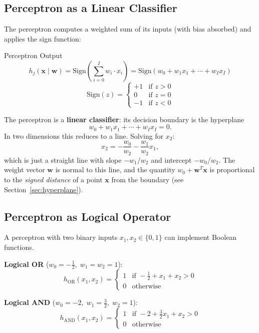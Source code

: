 \documentclass[11pt,a4paper]{article}
\newcommand{\term}[1]{\textcolor{DefGreen}{\textbf{#1}}}
\begin{document}
\subsection{Perceptron as a Linear Classifier}

The perceptron computes a weighted sum of its inputs (with bias absorbed) and applies the sign function:

\begin{defbox}{Perceptron Output}
\[
h_j(\mathbf{x} \mid \mathbf{w}) = \mathrm{Sign}\!\left(\sum_{i=0}^{I} w_i \cdot x_i\right)
= \mathrm{Sign}(w_0 + w_1 x_1 + \cdots + w_I x_I)
\]
\[
\mathrm{Sign}(z) = \begin{cases} +1 & \text{if } z > 0 \\ 0 & \text{if } z = 0 \\ -1 & \text{if } z < 0 \end{cases}
\]
\end{defbox}

The perceptron is a \term{linear classifier}: its decision boundary is the hyperplane
\[
w_0 + w_1 x_1 + \cdots + w_I x_I = 0.
\]
In two dimensions this reduces to a line. Solving for $x_2$:
\[
x_2 = -\frac{w_0}{w_2} - \frac{w_1}{w_2} x_1,
\]
which is just a straight line with slope $-w_1/w_2$ and intercept $-w_0/w_2$. The weight vector $\mathbf{w}$ is normal to this line, and the quantity $w_0 + \mathbf{w}^T\mathbf{x}$ is proportional to the \emph{signed distance} of a point $\mathbf{x}$ from the boundary (see Section~\ref{sec:hyperplane}).

\subsection{Perceptron as Logical Operator}

A perceptron with two binary inputs $x_1, x_2 \in \{0,1\}$ can implement Boolean functions.

\textbf{Logical OR} ($w_0 = -\tfrac{1}{2},\; w_1 = w_2 = 1$):
\[
h_{\mathrm{OR}}(x_1, x_2) = \begin{cases} 1 & \text{if } -\tfrac{1}{2} + x_1 + x_2 > 0 \\ 0 & \text{otherwise} \end{cases}
\]

\textbf{Logical AND} ($w_0 = -2,\; w_1 = \tfrac{3}{2},\; w_2 = 1$):
\[
h_{\mathrm{AND}}(x_1, x_2) = \begin{cases} 1 & \text{if } -2 + \tfrac{3}{2}x_1 + x_2 > 0 \\ 0 & \text{otherwise} \end{cases}
\]
\end{document}
